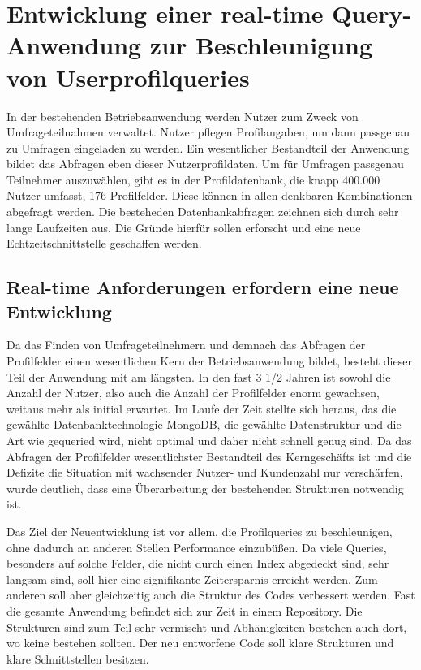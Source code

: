\chapter{Entwicklung einer real-time Query-Anwendung zur Beschleunigung von Userprofilqueries}
In der bestehenden Betriebsanwendung werden Nutzer zum Zweck von Umfrageteilnahmen verwaltet. Nutzer pflegen Profilangaben, um dann passgenau zu Umfragen eingeladen zu werden.
Ein wesentlicher Bestandteil der Anwendung bildet das Abfragen eben dieser Nutzerprofildaten. Um für Umfragen passgenau Teilnehmer auszuwählen, gibt es in der Profildatenbank, die knapp 400.000 Nutzer umfasst, 176 Profilfelder. Diese können in allen denkbaren Kombinationen abgefragt werden. Die besteheden Datenbankabfragen zeichnen sich durch sehr lange Laufzeiten aus. Die Gründe hierfür sollen erforscht und eine neue Echtzeitschnittstelle geschaffen werden.

\section{Real-time Anforderungen erfordern eine neue Entwicklung}
Da das Finden von Umfrageteilnehmern und demnach das Abfragen der Profilfelder einen wesentlichen Kern der Betriebsanwendung bildet, besteht dieser Teil der Anwendung mit am längsten. In den fast 3 1/2 Jahren ist sowohl die Anzahl der Nutzer, also auch die Anzahl der Profilfelder enorm gewachsen, weitaus mehr als initial erwartet. Im Laufe der Zeit stellte sich heraus, das die gewählte Datenbanktechnologie MongoDB, die gewählte Datenstruktur und die Art wie gequeried wird, nicht optimal und daher nicht schnell genug sind. Da das Abfragen der Profilfelder wesentlichster Bestandteil des Kerngeschäfts ist und die Defizite die Situation mit wachsender Nutzer- und Kundenzahl nur verschärfen, wurde deutlich, dass eine Überarbeitung der bestehenden Strukturen notwendig ist.

Das Ziel der Neuentwicklung ist vor allem, die Profilqueries zu beschleunigen, ohne dadurch an anderen Stellen Performance einzubüßen. Da viele Queries, besonders auf solche Felder, die nicht durch einen Index abgedeckt sind, sehr langsam sind, soll hier eine signifikante Zeitersparnis erreicht werden. Zum anderen soll aber gleichzeitig auch die Struktur des Codes verbessert werden. Fast die gesamte Anwendung befindet sich zur Zeit in einem Repository. Die Strukturen sind zum Teil sehr vermischt und Abhänigkeiten bestehen auch dort, wo keine bestehen sollten. Der neu entworfene Code soll klare Strukturen und klare Schnittstellen besitzen.

